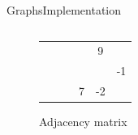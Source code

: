 \begin{frame}{Graphs}{Implementation}
\begin{columns}
\begin{column}{0.45\linewidth}
\begin{figure}[!h]
\begin{tabular}{p{0.25em}p{1.15em}p{1.15em}p{1.15em}p{1.15em}p{1.15em}}
          \cline{3-6}
          {} & {%
            \def\verticenumber{1}%
          } &
          \multicolumn{1}{|c|}{} & \multicolumn{1}{c}{} &
          \multicolumn{1}{|c|}{\color{Mittel-Gruen}9} & \multicolumn{1}{c|}{}\\
          \cline{3-6}
          {} & {%
            \def\verticenumber{2}%
          } &
          \multicolumn{1}{|c|}{} & \multicolumn{1}{c}{} &
          \multicolumn{1}{|c|}{} & \multicolumn{1}{c|}{\color{Mittel-Gruen}-1}\\
          \cline{3-6}
          {} & {%
            \def\verticenumber{3}%
          } &
          \multicolumn{1}{|c|}{} & \multicolumn{1}{c}{\color{Mittel-Gruen}7} &
          \multicolumn{1}{|c|}{\color{Mittel-Gruen}-2} & \multicolumn{1}{c|}{}\\
          \cline{3-6}
        \end{tabular}
        \caption{Adjacency matrix}
      \end{figure}
    \end{column}
  \end{columns}
\end{frame}


